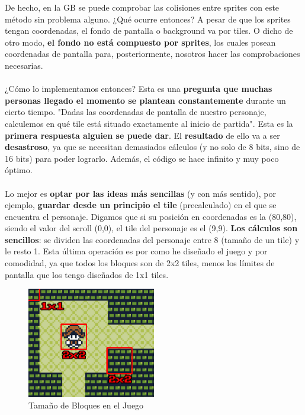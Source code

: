 De hecho, en la GB se puede comprobar las colisiones entre sprites con este método sin problema alguno. ¿Qué ocurre entonces? A pesar de que los sprites tengan coordenadas, el fondo de pantalla o background va por tiles. O dicho de otro modo, \textbf{el fondo no está compuesto por sprites}, los cuales posean coordenadas de pantalla para, posteriormente, nosotros hacer las comprobaciones necesarias.
\\ \\
¿Cómo lo implementamos entonces? Esta es una \textbf{pregunta que muchas personas llegado el momento se plantean constantemente} durante un cierto tiempo. "Dadas las coordenadas de pantalla de nuestro personaje, calculemos en qué tile está situado exactamente al inicio de partida". Esta es la \textbf{primera respuesta alguien se puede dar}. El \textbf{resultado} de ello va a ser \textbf{desastroso}, ya que se necesitan demasiados cálculos (y no solo de 8 bits, sino de 16 bits) para poder lograrlo. Además, el código se hace infinito y muy poco óptimo.
\\ \\
Lo mejor es \textbf{optar por las ideas más sencillas} (y con más sentido), por ejemplo, \textbf{guardar desde un principio el tile} (precalculado) en el que se encuentra el personaje. Digamos que si su posición en coordenadas es la (80,80), siendo el valor del scroll (0,0), el tile del personaje es el (9,9). \textbf{Los cálculos son sencillos}: se dividen las coordenadas del personaje entre 8 (tamaño de un tile) y le resto 1. Esta última operación es por como he diseñado el juego y por comodidad, ya que todos los bloques son de 2x2 tiles, menos los límites de pantalla que los tengo diseñados de 1x1 tiles.

\begin{figure}[h]
\centering
\includegraphics[width=0.5\textwidth]{include/images/desarrollo/tiles_width.png}
\caption{Tamaño de Bloques en el Juego}
\label{figure:tiles_width}
\end{figure}

